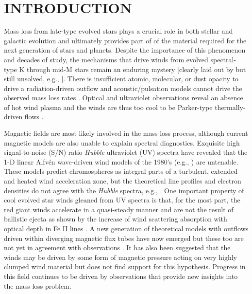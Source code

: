 \documentclass[iop]{emulateapj}
\begin{document}

\section{INTRODUCTION}

Mass loss from late-type evolved stars plays a crucial role in both stellar and galactic evolution and ultimately provides part of of the material required for the next generation of stars and planets. Despite the importance of this phenomenon and decades of study, the mechanisms that drive winds from evolved spectral-type K through mid-M stars remain an enduring mystery [clearly laid out by \cite{1985ASSL..117..229H} but still unsolved, e.g., \citealt{2009AIPC.1094..267C}]. There is insufficient atomic, molecular, or dust opacity to drive a radiation-driven outflow and acoustic/pulsation models cannot drive the observed mass loss rates \citep{1995ApJ...442L..61S}. Optical and ultraviolet observations reveal an absence of hot wind plasma and the winds are thus too cool to be Parker-type thermally-driven flows \cite[e.g.,][]{1979ApJ...229L..27L,1981ApJ...250..293A}. 

Magnetic fields are most likely involved in the mass loss process, although current magnetic models are also unable to explain spectral diagnostics. Exquisite high signal-to-noise (S/N) ratio \textit{Hubble} ultraviolet (UV) spectra have revealed that the 1-D linear Alfv\'en wave-driven wind models of the 1980’s (e.g., \citealt{1980ApJ...242..260H,1988PhDT........13H}) are untenable. These models predict chromospheres as integral parts of a turbulent, extended and heated wind acceleration zone, but the theoretical line profiles and electron densities do not agree with the \textit{Hubble} spectra, e.g., \cite{1998ApJ...494..828J}. One important property of cool evolved star winds gleaned from UV spectra is that, for the most part, the red giant winds accelerate in a quasi-steady manner and are not the result of ballistic ejecta as shown by the increase of wind scattering absorption with optical depth in Fe II lines \citep{1999ApJ...521..382C}. A new generation of theoretical models with outflows driven within diverging magnetic flux tubes have now emerged \citep{2006MNRAS.368.1145F, 2007ApJ...659.1592S} but these too are not yet in agreement with observations \citep{2009AIPC.1094..267C}. It has also been suggested that the winds may be driven by some form of magnetic pressure acting on very highly clumped wind material \citep{2008AJ....136.1964E} but \cite{2010ApJ...720.1767H} does not find support for this hypothesis. Progress in this field continues to be driven by observations that provide new insights into the mass loss problem.
\end{document}
